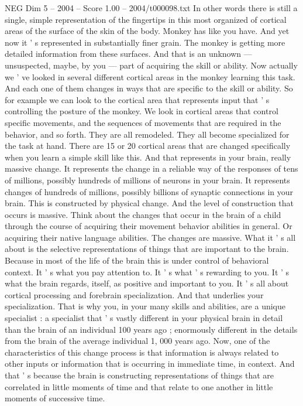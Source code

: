 \begin{textsample}{NEG Dim 5 – 2004 – Score 1.00 – 2004/t000098.txt}
In other words there is still a single, simple representation of the fingertips in this most organized of cortical areas of the surface of the skin of the body.
Monkey has like you have.
And yet now it ' s represented in substantially finer grain.
The monkey is getting more detailed information from these surfaces.
And that is an unknown — unsuspected, maybe, by you — part of acquiring the skill or ability.
Now actually we ' ve looked in several different cortical areas in the monkey learning this task.
And each one of them changes in ways that are specific to the skill or ability.
So for example we can look to the cortical area that represents input that ' s controlling the posture of the monkey.
We look in cortical areas that control specific movements, and the sequences of movements that are required in the behavior, and so forth.
They are all remodeled.
They all become specialized for the task at hand.
There are 15 or 20 cortical areas that are changed specifically when you learn a simple skill like this.
And that represents in your brain, really massive change.
It represents the change in a reliable way of the responses of tens of millions, possibly hundreds of millions of neurons in your brain.
It represents changes of hundreds of millions, possibly billions of synaptic connections in your brain.
This is constructed by physical change.
And the level of construction that occurs is massive.
Think about the changes that occur in the brain of a child through the course of acquiring their movement behavior abilities in general.
Or acquiring their native language abilities.
The changes are massive.
What it ' s all about is the selective representations of things that are important to the brain.
Because in most of the life of the brain this is under control of behavioral context.
It ' s what you pay attention to.
It ' s what ' s rewarding to you.
It ' s what the brain regards, itself, as positive and important to you.
It ' s all about cortical processing and forebrain specialization.
And that underlies your specialization.
That is why you, in your many skills and abilities, are a unique specialist : a specialist that ' s vastly different in your physical brain in detail than the brain of an individual 100 years ago ; enormously different in the details from the brain of the average individual 1, 000 years ago.
Now, one of the characteristics of this change process is that information is always related to other inputs or information that is occurring in immediate time, in context.
And that ' s because the brain is constructing representations of things that are correlated in little moments of time and that relate to one another in little moments of successive time.

\end{textsample}
